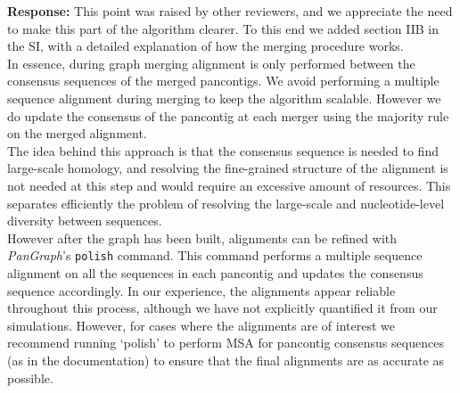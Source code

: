 \documentclass[aps,rmp,onecolumn]{revtex4-1}
\newcommand{\response}[1]{{{\color{response}\textbf{Response:} #1}}\vskip 5mm}
\newcommand{\SIalgo}{II}
\begin{document}
\response{This point was raised by other reviewers, and we appreciate the need to make this part of the algorithm clearer. 
To this end we added section {\SIalgo}B in the SI, with a detailed explanation of how the merging procedure works.\\
In essence, during graph merging alignment is only performed between the consensus sequences of the merged pancontigs. 
We avoid performing a multiple sequence alignment during merging to keep the algorithm scalable. 
However we do update the consensus of the pancontig at each merger using the majority rule on the merged alignment.\\
The idea behind this approach is that the consensus sequence is needed to find large-scale homology, and resolving the fine-grained structure of the alignment is not needed at this step and would require an excessive amount of resources. 
This separates efficiently the problem of resolving the large-scale and nucleotide-level diversity between sequences.\\
However after the graph has been built, alignments can be refined with \textit{PanGraph}'s \texttt{polish} command. 
This command performs a multiple sequence alignment on all the sequences in each pancontig and updates the consensus sequence accordingly. In our experience, the alignments appear reliable throughout this process, although we have not explicitly quantified it from our simulations. However, for cases where the alignments are of interest we recommend running `polish' to perform MSA for pancontig consensus sequences (as in the documentation) to ensure that the final alignments are as accurate as possible.  
}
\end{document}
